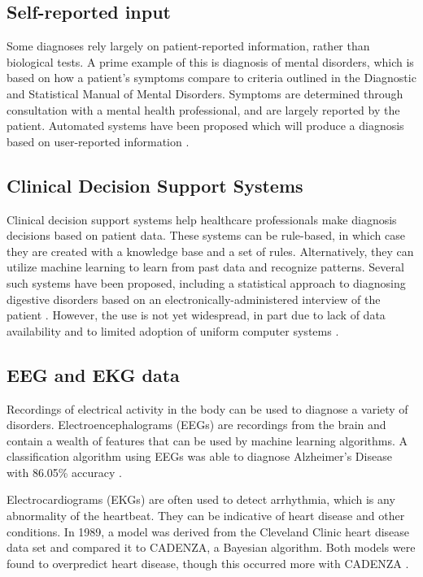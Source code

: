 \documentclass[draftcopy]{srpaper}
\begin{document}
\subsection{Self-reported input}
Some diagnoses rely largely on patient-reported information, rather than
biological tests. A prime example of this is diagnosis of mental disorders,
which is based on how a patient's symptoms compare to criteria
outlined in the Diagnostic and Statistical Manual of Mental
Disorders. Symptoms are determined through consultation with a mental
health professional, and are largely reported by the
patient. Automated systems
have been proposed which will produce a diagnosis based on
user-reported information \cite{yap1996}.

\subsection{Clinical Decision Support Systems}
Clinical decision support systems help healthcare professionals make
diagnosis decisions based on patient data. These systems can be
rule-based, in which case they are created with a knowledge base and
a set of rules. Alternatively, they can utilize machine learning to
learn from past data and recognize patterns. Several such
systems have been proposed, including a statistical approach to
diagnosing digestive disorders based on an electronically-administered interview of the
patient \cite{SK84}. However, the use is not yet widespread, in part
due to lack of data availability and to limited adoption of uniform
computer systems \cite{Greenes2007}.

\subsection{EEG and EKG data}
Recordings of electrical activity in the body can be used to diagnose a variety of
disorders. Electroencephalograms (EEGs) are recordings from the brain
and contain a wealth of features that can be used by machine learning
algorithms. A classification algorithm using EEGs was able to diagnose
Alzheimer's Disease with 86.05\% accuracy \cite{Pod12}.

Electrocardiograms (EKGs) are often used to detect arrhythmia, which is any
abnormality of the heartbeat. They can be indicative of heart disease
and other conditions. In 1989, a model was derived from the Cleveland Clinic heart disease data set and
compared it to CADENZA, a Bayesian algorithm. Both models were found
to overpredict heart disease, though this occurred more with CADENZA
\cite{Det89}. 
\end{document}
